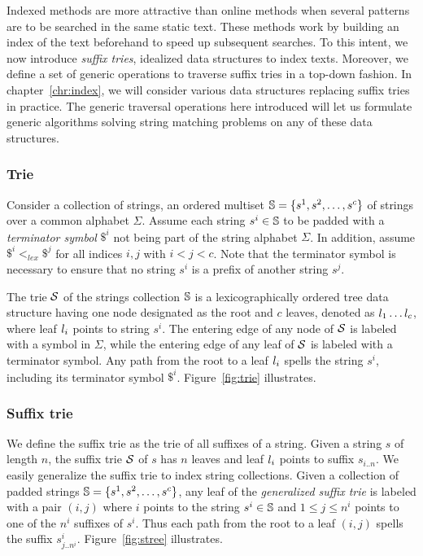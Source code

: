 Indexed methods are more attractive than online methods when several patterns are to be searched in the same static text.
These methods work by building an index of the text beforehand to speed up subsequent searches.
To this intent, we now introduce \emph{suffix tries}, idealized data structures to index texts.
Moreover, we define a set of generic operations to traverse suffix tries in a top-down fashion.
In chapter~\ref{chr:index}, we will consider various data structures replacing suffix tries in practice.
The generic traversal operations here introduced will let us formulate generic algorithms solving string matching problems on any of these data structures.

\subsubsection{Trie}

Consider a collection of strings, \ie an ordered multiset $\S = \{ s^1, s^2, \dots, s^c \}$ of strings over a common alphabet $\Sigma$.
Assume \wlogs each string $s^i \in \S$ to be padded with a \emph{terminator symbol} $\$^i$ not being part of the string alphabet $\Sigma$.
In addition, assume $\$^i <_{lex} \$^j$ for all indices $i,j$ with $i < j < c$.
Note that the terminator symbol is necessary to ensure that no string $s^i$ is a prefix of another string $s^j$.

The trie $\Si$ of the strings collection $\S$ is a lexicographically ordered tree data structure having one node designated as the root and $c$ leaves, denoted as $\Ln_1 \dots \Ln_c$, where leaf $\Ln_i$ points to string $s^i$.
The entering edge of any node of $\Si$ is labeled with a symbol in $\Sigma$, while the entering edge of any leaf of $\Si$ is labeled with a terminator symbol.
Any path from the root to a leaf $\Ln_i$ spells the string $s^i$, including its terminator symbol $\$^i$.
Figure~\ref{fig:trie} illustrates.

\subsubsection{Suffix trie}

We define the suffix trie as the trie of all suffixes of a string.
Given a string $s$ of length $n$, the suffix trie $\Si$ of $s$ has $n$ leaves and leaf $\Ln_i$ points to suffix $s_{i..n}$.
We easily generalize the suffix trie to index string collections.
Given a collection of padded strings $\Sc = \{ s^1, s^2, \dots, s^c \}$, any leaf of the \emph{generalized suffix trie} is labeled with a pair $(i,j)$ where $i$ points to the string $s^i \in \Sc$ and $1 \leq j \leq n^i$ points to one of the $n^i$ suffixes of $s^i$.
Thus each path from the root to a leaf $(i,j)$ spells the suffix $s^i_{j..n^i}$.
Figure~\ref{fig:stree} illustrates.

